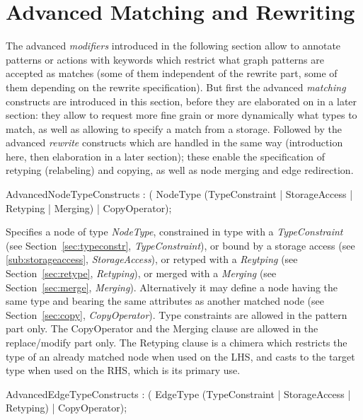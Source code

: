 \chapter{Advanced Matching and Rewriting}
\label{chapadvanced}

The advanced \emph{modifiers} introduced in the following section allow to annotate patterns or actions with keywords which restrict what graph patterns are accepted as matches (some of them independent of the rewrite part, some of them depending on the rewrite specification).
But first the advanced \emph{matching} constructs are introduced in this section, before they are elaborated on in a later section:
they allow to request more fine grain or more dynamically what types to match, as well as allowing to specify a match from a storage.
Followed by the advanced \emph{rewrite} constructs which are handled in the same way (introduction here, then elaboration in a later section);
these enable the specification of retyping (relabeling) and copying, as well as node merging and edge redirection.

\begin{rail}
AdvancedNodeTypeConstructs : ( NodeType (TypeConstraint | StorageAccess | Retyping | Merging) | CopyOperator);
\end{rail}

Specifies a node of type \emph{NodeType},
constrained in type with a \emph{TypeConstraint} (see Section~\ref{sec:typeconstr}, \emph{TypeConstraint}),
or bound by a storage access (see \ref{sub:storageaccess}, \emph{StorageAccess}),
or retyped with a \emph{Reytping} (see Section~\ref{sec:retype}, \emph{Retyping}),
or merged with a \emph{Merging} (see Section~\ref{sec:merge}, \emph{Merging}).
Alternatively it may define a node having the same type and bearing the same attributes as another matched node (see Section~\ref{sec:copy}, \emph{CopyOperator}).
Type constraints are allowed in the pattern part only.
The CopyOperator and the Merging clause are allowed in the replace/modify part only.
The Retyping clause is a chimera which restricts the type of an already matched node when used on the LHS, and casts to the target type when used on the RHS, which is its primary use.

\begin{rail}
AdvancedEdgeTypeConstructs : ( EdgeType (TypeConstraint | StorageAccess | Retyping) | CopyOperator);
\end{rail}

